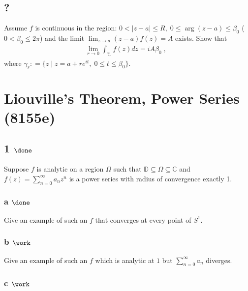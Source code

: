 \hypertarget{section-5}{%
\subsection{?}\label{section-5}}

Assume \(f\) is continuous in the region:
\(0< |z-a| \leq R, \; 0 \leq \arg(z-a) \leq \beta_0\)
(\(0 < \beta_0 \leq 2 \pi\)) and the limit
\(\displaystyle \lim_{z \rightarrow a} (z-a) f(z) = A\) exists. Show
that
\begin{align*}\lim_{r \rightarrow 0} \int_{\gamma_r} f(z) dz  = i A \beta_0 \; , \; \;\end{align*}
where
\(\gamma_r : = \{ z \; | \; z = a + r e^{it}, \; 0 \leq t \leq \beta_0 \}.\)

\hypertarget{liouvilles-theorem-power-series-8155e}{%
\section{Liouville's Theorem, Power Series
(8155e)}\label{liouvilles-theorem-power-series-8155e}}

\hypertarget{done-3}{%
\subsection{\texorpdfstring{1
\(\done\)}{1 \textbackslash done}}\label{done-3}}

Suppose \(f\) is analytic on a region \(\Omega\) such that
\({\mathbb{D}}\subseteq \Omega \subseteq {\mathbb{C}}\) and
\(f(z) = \sum_{n=0}^\infty a_n z^n\) is a power series with radius of
convergence exactly 1.

\hypertarget{a-done}{%
\subsubsection{\texorpdfstring{a
\(\done\)}{a \textbackslash done}}\label{a-done}}

Give an example of such an \(f\) that converges at every point of
\(S^1\).

\hypertarget{b-work-3}{%
\subsubsection{\texorpdfstring{b
\(\work\)}{b \textbackslash work}}\label{b-work-3}}

Give an example of such an \(f\) which is analytic at \(1\) but
\(\sum_{n=0}^\infty a_n\) diverges.

\hypertarget{c-work-3}{%
\subsubsection{\texorpdfstring{c
\(\work\)}{c \textbackslash work}}\label{c-work-3}}

